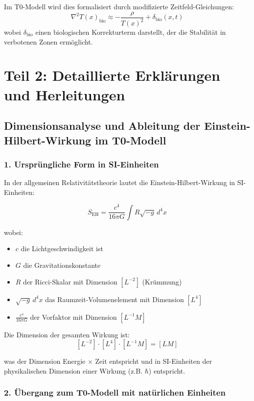 \documentclass[12pt,a4paper]{article}
\newcommand{\Tfield}{T(x)}
\begin{document}
	Im T0-Modell wird dies formalisiert durch modifizierte Zeitfeld-Gleichungen:
	\[
	\nabla^2 \Tfield_{\mathrm{bio}} \approx -\frac{\rho}{\Tfield^2} + \delta_{\mathrm{bio}}(x,t)
	\]
	wobei \(\delta_{\mathrm{bio}}\) einen biologischen Korrekturterm darstellt, der die Stabilität in verbotenen Zonen ermöglicht.
	
	\section*{Teil 2: Detaillierte Erklärungen und Herleitungen}
	
	\subsection*{Dimensionsanalyse und Ableitung der Einstein-Hilbert-Wirkung im T0-Modell}
	
	\subsubsection*{1. Ursprüngliche Form in SI-Einheiten}
	
	In der allgemeinen Relativitätstheorie lautet die Einstein-Hilbert-Wirkung in SI-Einheiten:
	
	\[
	S_{\mathrm{EH}} = \frac{c^4}{16\pi G} \int R \sqrt{-g} \, d^4x
	\]
	
	wobei:
	\begin{itemize}
		\item $c$ die Lichtgeschwindigkeit ist
		\item $G$ die Gravitationskonstante
		\item $R$ der Ricci-Skalar mit Dimension $[L^{-2}]$ (Krümmung)
		\item $\sqrt{-g} \, d^4x$ das Raumzeit-Volumenelement mit Dimension $[L^4]$
		\item $\frac{c^4}{16\pi G}$ der Vorfaktor mit Dimension $[L^{-1} M]$
	\end{itemize}
	
	Die Dimension der gesamten Wirkung ist:
	\[
	[L^{-2}] \cdot [L^4] \cdot [L^{-1} M] = [L M]
	\]
	
	was der Dimension Energie $\times$ Zeit entspricht und in SI-Einheiten der physikalischen Dimension einer Wirkung (z.B. $\hbar$) entspricht.
	
	\subsubsection*{2. Übergang zum T0-Modell mit natürlichen Einheiten}
	
\end{document}
